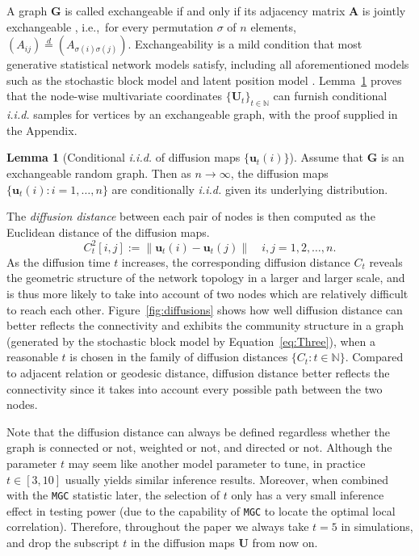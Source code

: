 \documentclass[11pt]{article}
\theoremstyle{definition}
\newtheorem{lemma}[theorem]{Lemma}
\begin{document}
A graph $\mathbf{G}$ is called exchangeable if and only if its adjacency matrix $\mathbf{A}$ is jointly exchangeable \cite{orbanz2015bayesian}, i.e.,~for every permutation $\sigma$ of $n$ elements, $(A_{ij}) \stackrel{d}{=} (A_{\sigma(i) \sigma(j)})$. Exchangeability is a mild condition that most generative statistical network models satisfy, including all aforementioned models such as the stochastic block model and latent position model \cite{rohe2011spectral, sussman2014consistent, todeschini2016exchangeable}. Lemma~\ref{main_lemma} proves that the node-wise multivariate coordinates $\{ \mathbf{U}_{t} \}_{t \in \mathbb{N}}$ can furnish conditional \textit{i.i.d.} samples for vertices by an exchangeable graph, with the proof supplied in the Appendix.
\begin{lemma}[Conditional \textit{i.i.d.} of diffusion maps $\{\mathbf{u}_{t}(i)\}$]
	\label{main_lemma}
	Assume that $\mathbf{G}$ is an exchangeable random graph. Then as $n \rightarrow \infty$, the diffusion maps $\{ \mathbf{u}_{t}(i) : i = 1, \ldots, n \}$ are conditionally \textit{i.i.d.} given its underlying distribution.  
\end{lemma}

The \textit{diffusion distance} between each pair of nodes is then computed as the Euclidean distance of the diffusion maps. 
\begin{equation}
\label{eq:diffusion}
C^2_{t}[i,j]  :=   \parallel \mathbf{u}_{t}(i) - \mathbf{u}_{t}(j) \parallel   \quad i,j = 1,2, \ldots , n.
\end{equation}
As the diffusion time $t$ increases, the corresponding diffusion distance $C_{t}$ reveals the geometric structure of the network topology in a larger and larger scale, and is thus more likely to take into account of two nodes which are relatively difficult to reach each other. Figure~\ref{fig:diffusions} shows how well diffusion distance can better reflects the connectivity and exhibits the community structure in a graph (generated by the stochastic block model by Equation~\ref{eq:Three}), when a reasonable $t$ is chosen in the family of diffusion distances $\{ C_{t} : t \in \mathbb{N} \}$. Compared to adjacent relation or geodesic distance, diffusion distance better reflects the connectivity since it takes into account every possible path between the two nodes. 

Note that the diffusion distance can always be defined regardless whether the graph is connected or not, weighted or not, and directed or not. Although the parameter $t$ may seem like another model parameter to tune, in practice $t \in [3,10]$ usually yields similar inference results. Moreover, when combined with the \texttt{MGC} statistic later, the selection of $t$ only has a very small inference effect in testing power (due to the capability of \texttt{MGC} to locate the optimal local correlation). Therefore, throughout the paper we always take $t=5$ in simulations, and drop the subscript $t$ in the diffusion maps $\mathbf{U}$ from now on. 
\end{document}

